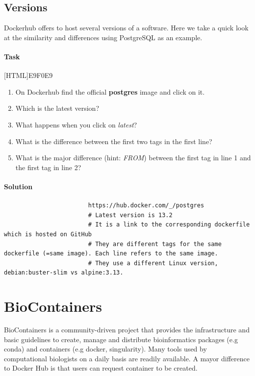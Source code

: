 \documentclass[12pt]{article}
\begin{document}
	
		\subsection{Versions}
			Dockerhub offers to host several versions of a software.
			Here we take a quick look at the similarity and differences using PostgreSQL as an example.
			 
			\paragraph{Task}
				[HTML]{E9F0E9}{\parbox{\linewidth}{%
						\begin{enumerate}
							\item On Dockerhub find the official  \textbf{postgres} image and click on it.
							\item Which is the latest version?
							\item What happens when you click on \textit{latest}?
							\item What is the difference between the first two tags in the first line?
							\item What is the major difference (hint: \textit{FROM}) between the first tag in line 1 and the first tag in line 2?
						\end{enumerate}
				}}
		
			\paragraph{Solution}
				\begin{minipage}{\linewidth}
					\begin{lstlisting}
						https://hub.docker.com/_/postgres
						# Latest version is 13.2
						# It is a link to the corresponding dockerfile which is hosted on GitHub 
						# They are different tags for the same dockerfile (=same image). Each line refers to the same image.
						# They use a different Linux version, debian:buster-slim vs alpine:3.13.  
					\end{lstlisting}
				\end{minipage}
	

		

	\section{BioContainers}
		BioContainers is a community-driven project that provides the infrastructure and basic guidelines to create, manage and distribute bioinformatics packages (e.g conda) and containers (e.g docker, singularity).
		Many tools used by computational biologists on a daily basis are readily available.
		A mayor difference to Docker Hub is that users can request container to be created. 
		
\end{document}
